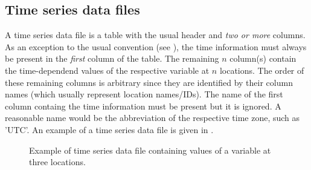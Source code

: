 \subsection{Time series data files} \label{sec:input-timeseries}

A time series data file is a table with the usual header and \emph{two or more} columns. As an exception to the usual convention (see ), the time information must always be present in the \emph{first} column of the table. The remaining $n$ column(s) contain the time-dependend values of the respective variable at $n$ locations. The order of these remaining columns is arbitrary since they are identified by their column names (which usually represent location names/IDs). The name of the first column containg the time information must be present but it is ignored. A reasonable name would be the abbreviation of the respective time zone, such as 'UTC'. An example of a time series data file is given in .

\begin{figure*}[htbp]
  
  \caption{Example of time series data file containing values of a variable at three locations. \label{fig:input-timeseries}}
\end{figure*}

